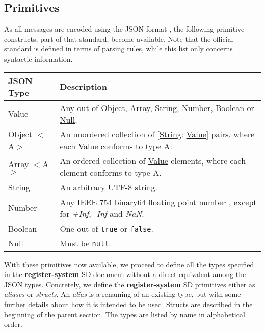 \documentclass[a4paper]{arrowhead}
\newcommand{\pdef}[1]{{\textcolor{ArrowheadGrey}{#1 \label{sec:model:primitives:#1} \label{sec:model:primitives:#1s}}}}
\newcommand{\pref}[1]{{\textcolor{ArrowheadGrey}{\hyperref[sec:model:primitives:#1]{#1}}}}
\begin{document}
\subsection{Primitives}
\label{sec:model:primitives}

As all messages are encoded using the JSON format \cite{bray2014json}, the following primitive constructs, part of that standard, become available.
Note that the official standard is defined in terms of parsing rules, while this list only concerns syntactic information. 

\begin{table}[ht!]
\begin{tabularx}{\textwidth}{| p{3cm} | X |} \hline
\rowcolor{gray!33} JSON Type & Description \\ \hline
\pdef{Value}                 & Any out of \pref{Object}, \pref{Array}, \pref{String}, \pref{Number}, \pref{Boolean} or \pref{Null}. \\ \hline
\pdef{Object}$<$A$>$         & An unordered collection of $[$\pref{String}: \pref{Value}$]$ pairs, where each \pref{Value} conforms to type A. \\ \hline
\pdef{Array}$<$A$>$          & An ordered collection of \pref{Value} elements, where each element conforms to type A. \\ \hline
\pdef{String}                & An arbitrary UTF-8 string. \\ \hline
\pdef{Number}                & Any IEEE 754 binary64 floating point number \cite{cowlishaw2019floating}, except for \textit{+Inf}, \textit{-Inf} and \textit{NaN}. \\ \hline
\pdef{Boolean}               & One out of \texttt{true} or \texttt{false}. \\ \hline
\pdef{Null}                  & Must be \texttt{null}. \\ \hline
\end{tabularx}
\end{table}

With these primitives now available, we proceed to define all the types specified in the \textbf{register-system} SD document without a direct equivalent among the JSON types.
Concretely, we define the \textbf{register-system} SD primitives either as \textit{aliases} or \textit{structs}.
An \textit{alias} is a renaming of an existing type, but with some further details about how it is intended to be used.
Structs are described in the beginning of the parent section.
The types are listed by name in alphabetical order.
\end{document}
